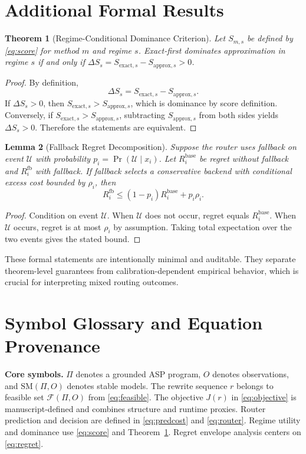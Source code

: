 \documentclass{article} %
\newtheorem{theorem}{Theorem}[section]
\newtheorem{lemma}[theorem]{Lemma}
\begin{document}
\section{Additional Formal Results}
\label{sec:app_formal}
\begin{theorem}[Regime-Conditional Dominance Criterion]
\label{thm:dominance}
Let $S_{m,s}$ be defined by \eqref{eq:score} for method $m$ and regime $s$. Exact-first dominates approximation in regime $s$ if and only if $\Delta S_s=S_{\text{exact},s}-S_{\text{approx},s}>0$.
\end{theorem}
\begin{proof}
By definition,
\[
\Delta S_s=S_{\text{exact},s}-S_{\text{approx},s}.
\]
If $\Delta S_s>0$, then $S_{\text{exact},s}>S_{\text{approx},s}$, which is dominance by score definition. Conversely, if $S_{\text{exact},s}>S_{\text{approx},s}$, subtracting $S_{\text{approx},s}$ from both sides yields $\Delta S_s>0$. Therefore the statements are equivalent.
\end{proof}

\begin{lemma}[Fallback Regret Decomposition]
\label{lem:fallback}
Suppose the router uses fallback on event $\mathcal{U}$ with probability $p_i=\Pr(\mathcal{U}\mid x_i)$. Let $R_i^{\text{base}}$ be regret without fallback and $R_i^{\text{fb}}$ with fallback. If fallback selects a conservative backend with conditional excess cost bounded by $\rho_i$, then
\[
R_i^{\text{fb}}\le (1-p_i)R_i^{\text{base}} + p_i\rho_i.
\]
\end{lemma}
\begin{proof}
Condition on event $\mathcal{U}$. When $\mathcal{U}$ does not occur, regret equals $R_i^{\text{base}}$. When $\mathcal{U}$ occurs, regret is at most $\rho_i$ by assumption. Taking total expectation over the two events gives the stated bound.
\end{proof}

These formal statements are intentionally minimal and auditable. They separate theorem-level guarantees from calibration-dependent empirical behavior, which is crucial for interpreting mixed routing outcomes.

\section{Symbol Glossary and Equation Provenance}
\label{sec:app_symbols}
\textbf{Core symbols.} $\Pi$ denotes a grounded ASP program, $O$ denotes observations, and $\mathrm{SM}(\Pi,O)$ denotes stable models. The rewrite sequence $r$ belongs to feasible set $\mathcal{F}(\Pi,O)$ from \eqref{eq:feasible}. The objective $J(r)$ in \eqref{eq:objective} is manuscript-defined and combines structure and runtime proxies. Router prediction and decision are defined in \eqref{eq:predcost} and \eqref{eq:router}. Regime utility and dominance use \eqref{eq:score} and Theorem~\ref{thm:dominance}. Regret envelope analysis centers on \eqref{eq:regret}.
\end{document}
